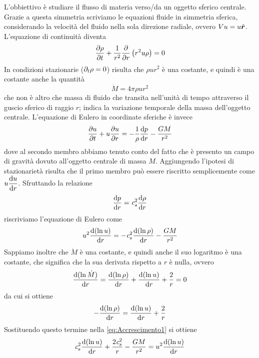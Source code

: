 L'obbiettivo è studiare il flusso di materia verso/da un oggetto sferico centrale. Grazie a questa simmetria scriviamo le equazioni fluide in simmetria sferica, considerando la velocità del fluido nella sola direzione radiale, ovvero $V{u}=u\vers{r}$. L'equazione di continuità diventa
\begin{equation}
\dfrac{\partial {\rho}}{\partial {t}} + \dfrac{1}{r^2} \dfrac{\partial {}}{\partial {r}}\left( r^2 u \rho \right)=0
\end{equation}
In condizioni stazionarie ($\partial_t\rho=0$) risulta che $\rho u r^2$ è una costante, e quindi è una costante anche la quantità
\begin{equation}
\dot{M} = 4\pi \rho u r^2
\end{equation}
che non è altro che massa di fluido che transita nell'unità di tempo attraverso il guscio sferico di raggio $r$; indica la variazione temporale della massa dell'oggetto centrale. L'equazione di Eulero in coordinate sferiche è invece
\begin{equation}
\dfrac{\partial {u}}{\partial {t}} + u\dfrac{\partial {u}}{\partial {r}}= -\dfrac{1}{\rho}\dfrac{\mathrm{d} {p}}{\mathrm{d} {r}} - \dfrac{GM}{r^2}  \label{eq:Accrescimento3}
\end{equation}
dove al secondo membro abbiamo tenuto conto del fatto che è presento un campo di gravità dovuto all'oggetto centrale di massa $M$. Aggiungendo l'ipotesi di stazionarietà risulta che il primo membro può essere riscritto semplicemente come $u\dfrac{\mathrm{d} {u}}{\mathrm{d} {r}}$. Sfruttando la relazione 
\begin{equation}
\dfrac{\mathrm{d} {p}}{\mathrm{d} {r}}=\textit{c}_{s}^2 \dfrac{\mathrm{d} {\rho}}{\mathrm{d} {r}}
\end{equation}
riscriviamo l'equazione di Eulero come
\begin{equation}
u^2\dfrac{\mathrm{d} {(\ln u)}}{\mathrm{d} {r}} = -\textit{c}_{s}^2 \dfrac{\mathrm{d} {(\ln\rho)}}{\mathrm{d} {r}} - \dfrac{GM}{r^2} \label{eq:Accrescimento1}
\end{equation}
Sappiamo inoltre che $\dot{M}$ è una costante, e quindi anche il suo logaritmo è una costante, che significa che la sua derivata rispetto a $r$ è nulla, ovvero
\begin{equation}
\dfrac{\mathrm{d} {(\ln \dot{M})}}{\mathrm{d} {r}} = \dfrac{\mathrm{d} {(\ln\rho)}}{\mathrm{d} {r}} + \dfrac{\mathrm{d} {(\ln u)}}{\mathrm{d} {r}} + \dfrac{2}{r} = 0
\end{equation}
da cui si ottiene
\begin{equation}
-\dfrac{\mathrm{d} {(\ln\rho)}}{\mathrm{d} {r}} = \dfrac{\mathrm{d} {(\ln u)}}{\mathrm{d} {r}} + \dfrac{2}{r} 
\end{equation}
Sostituendo questo termine nella \ref{eq:Accrescimento1} si ottiene
\begin{equation}
\textit{c}_{s}^2 \dfrac{\mathrm{d} {(\ln u)}}{\mathrm{d} {r}} + \dfrac{2\textit{c}_{s}^2}{r}  - \dfrac{GM}{r^2} = u^2\dfrac{\mathrm{d} {(\ln u)}}{\mathrm{d} {r}}
\end{equation}
